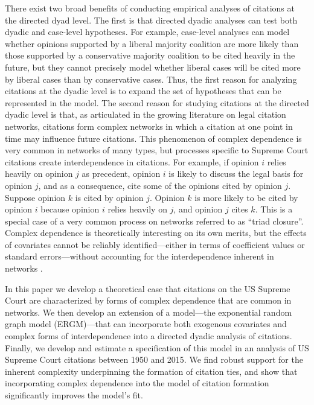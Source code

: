 \documentclass{cup-pan}
\begin{document}
There exist two broad benefits of conducting empirical analyses of citations at the directed dyad level. The first is that directed dyadic analyses can test both dyadic and case-level hypotheses. For example, case-level analyses can model whether opinions supported by a liberal majority coalition are more likely than those supported by a conservative majority coalition to be cited heavily in the future, but they cannot precisely model whether liberal cases will be cited more by liberal cases than by conservative cases. Thus, the first reason for analyzing citations at the dyadic level is to expand the set of hypotheses that can be represented in the model. The second reason for studying citations at the directed dyadic level is that, as articulated in the growing literature on legal citation networks, citations form complex networks in which a citation at one point in time may influence future citations. This phenomenon of complex dependence is very common in networks of many types, but processes specific to Supreme Court citations create interdependence in citations. For example, if opinion $i$ relies heavily on opinion $j$ as precedent, opinion $i$ is likely to discuss the legal basis for opinion $j$, and as a consequence, cite some of the opinions cited by opinion $j$. Suppose opinion $k$ is cited by opinion $j$. Opinion $k$ is more likely to be cited by opinion $i$ because opinion $i$ relies heavily on $j$, and opinion $j$ cites $k$.  This is a special case of a very common process on networks referred to as ``triad closure''. Complex dependence is theoretically interesting on its own merits, but the effects of covariates cannot be reliably identified---either in terms of coefficient values or standard errors---without accounting for the interdependence inherent in networks \citep{cranmer2016critique}. 

In this paper we develop a theoretical case that citations on the US Supreme Court are characterized by forms of complex dependence that are common in networks. We then develop an extension of a model---the exponential random graph model (ERGM)---that can incorporate both exogenous covariates and complex forms of interdependence into a directed dyadic analysis of citations. Finally, we develop and estimate a specification of this model in an analysis of US Supreme Court citations between 1950 and 2015. We find robust support for the inherent complexity underpinning the formation of citation ties, and show that incorporating complex dependence into the model of citation formation significantly improves the model's fit.
\end{document}

